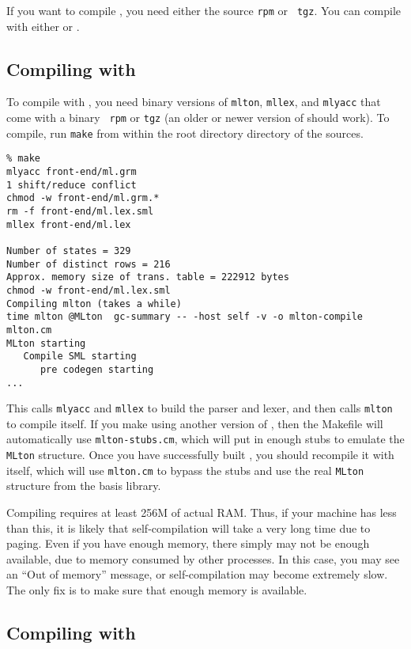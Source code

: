 
If you want to compile {\mlton}, you need either the source {\tt rpm} or {\tt
tgz}.  You can compile with either {\mlton} or {\smlnj}.

\subsection{Compiling with {\mlton}}

To compile with {\mlton}, you need binary versions of {\tt mlton},
{\tt mllex}, and {\tt mlyacc} that come with a {\mlton} binary {\tt
rpm} or {\tt tgz} (an older or newer version of {\mlton} should work).
To compile, run {\tt make} from within the root directory directory of the
sources.
\begin{verbatim}
% make
mlyacc front-end/ml.grm
1 shift/reduce conflict
chmod -w front-end/ml.grm.*
rm -f front-end/ml.lex.sml
mllex front-end/ml.lex

Number of states = 329
Number of distinct rows = 216
Approx. memory size of trans. table = 222912 bytes
chmod -w front-end/ml.lex.sml
Compiling mlton (takes a while)
time mlton @MLton  gc-summary -- -host self -v -o mlton-compile mlton.cm
MLton starting
   Compile SML starting
      pre codegen starting
...
\end{verbatim}
This calls {\tt mlyacc} and {\tt mllex} to build the parser and lexer, and then
calls {\tt mlton} to compile itself.  If you make {\mlton} using another version
of {\mlton}, then the Makefile will automatically use {\tt mlton-stubs.cm},
which will put in enough stubs to emulate the {\tt MLton} structure.  Once you
have successfully built {\mlton}, you should recompile it with itself, which
will use {\tt mlton.cm} to bypass the stubs and use the real {\tt MLton}
structure from the basis library.

Compiling {\mlton} requires at least 256M of actual RAM.  Thus, if your machine
has less than this, it is likely that self-compilation will take a very long
time due to paging.  Even if you have enough memory, there simply may not be
enough available, due to memory consumed by other processes.  In this case, you
may see an ``Out of memory'' message, or self-compilation may become extremely
slow.  The only fix is to make sure that enough memory is available.

\subsection{Compiling with {\smlnj}}

